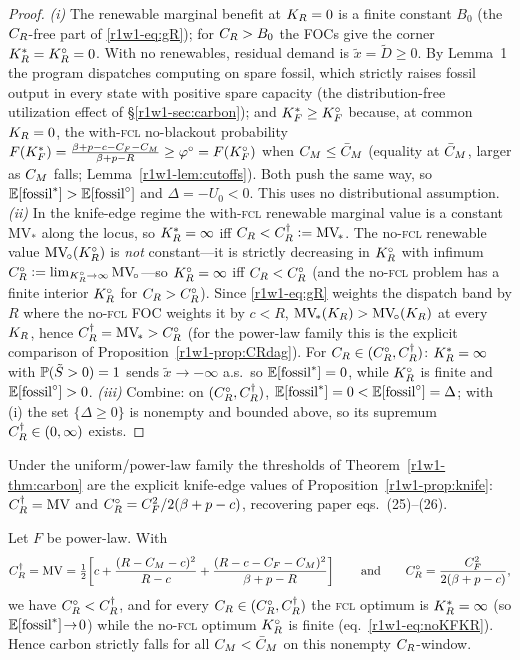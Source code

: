 \begin{proof}
\emph{(i)} The renewable marginal benefit at $K_R=0$ is a finite constant $B_0$
(the $C_R$-free part of \eqref{r1w1-eq:gR}); for $C_R>B_0$ the FOCs give the corner
$K_R^{*}=K_R^{\circ}=0$. With no renewables, residual demand is $\tilde x=\tilde D\ge0$. By
Lemma~1 the program dispatches computing on spare fossil, which strictly raises
fossil output in every state with positive spare capacity (the distribution-free
utilization effect of \S\ref{r1w1-sec:carbon}); and $K_F^{*}\ge K_F^{\circ}$ because, at common
$K_R=0$, the with-\textsc{fcl} no-blackout probability
$F(K_F^{*})=\frac{\beta+p-c-C_F-C_M}{\beta+p-R}\ge\varphi^{\circ}=F(K_F^{\circ})$ when $C_M\le\bar C_M$
(equality at $\bar C_M$, larger as $C_M$ falls; Lemma~\ref{r1w1-lem:cutoffs}). Both push
the same way, so $\mathbb{E}[\text{fossil}^{*}]>\mathbb{E}[\text{fossil}^{\circ}]$ and
$\Delta=-U_0<0$. This uses no distributional assumption.
\emph{(ii)} In the knife-edge regime the with-\textsc{fcl} renewable marginal value is a
constant $\mathrm{MV}_{\!*}$ along the locus, so $K_R^{*}=\infty$ iff
$C_R<C_R^{\dagger}\vcentcolon=\mathrm{MV}_{\!*}$. The no-\textsc{fcl} renewable value
$\mathrm{MV}_{\!\circ}(K_R^{\circ})$ is \emph{not} constant---it is strictly decreasing in $K_R^{\circ}$
with infimum $C_R^{\circ}\vcentcolon=\lim_{K_R^{\circ}\to\infty}\mathrm{MV}_{\!\circ}$---so $K_R^{\circ}=\infty$
iff $C_R<C_R^{\circ}$ (and the no-\textsc{fcl} problem has a finite interior $K_R^{\circ}$ for
$C_R>C_R^{\circ}$). Since \eqref{r1w1-eq:gR} weights the dispatch band by $R$ where the
no-\textsc{fcl} FOC weights it by $c<R$, $\mathrm{MV}_{\!*}(K_R)>\mathrm{MV}_{\!\circ}(K_R)$
at every $K_R$, hence $C_R^{\dagger}=\mathrm{MV}_{\!*}>C_R^{\circ}$ (for the power-law family
this is the explicit comparison of Proposition~\ref{r1w1-prop:CRdag}).
For $C_R\in(C_R^{\circ},C_R^{\dagger})$: $K_R^{*}=\infty$ with $\mathbb{P}(\tilde S>0)=1$ sends
$\tilde x\to-\infty$ a.s.\ so $\mathbb{E}[\text{fossil}^{*}]=0$, while $K_R^{\circ}$ is finite and
$\mathbb{E}[\text{fossil}^{\circ}]>0$.
\emph{(iii)} Combine: on $(C_R^{\circ},C_R^{\dagger})$, $\mathbb{E}[\text{fossil}^{*}]=0<\mathbb{E}[\text{fossil}^{\circ}]=\Delta$;
with (i) the set $\{\Delta\ge0\}$ is nonempty and bounded above, so its supremum
$C_R^{\dagger}\in(0,\infty)$ exists.
\end{proof}

\noindent Under the uniform/power-law family the thresholds of
Theorem~\ref{r1w1-thm:carbon} are the explicit knife-edge values of
Proposition~\ref{r1w1-prop:knife}: $C_R^{\dagger}=\mathrm{MV}$ and
$C_R^{\circ}=C_F^2/2(\beta+p-c)$, recovering paper eqs.\ (25)--(26).

\begin{proposition}\label{r1w1-prop:CRdag}
Let $F$ be power-law. With
\[
  C_R^{\dagger}=\mathrm{MV}
  =\tfrac12\!\left[c+\frac{(R-C_M-c)^2}{R-c}+\frac{(R-c-C_F-C_M)^2}{\beta+p-R}\right]
  \qquad\text{and}\qquad
  C_R^{\circ}=\frac{C_F^{2}}{2(\beta+p-c)},
\]
we have $C_R^{\circ}<C_R^{\dagger}$, and for every $C_R\in(C_R^{\circ},C_R^{\dagger})$
the \textsc{fcl} optimum is $K_R^{*}=\infty$ (so $\mathbb{E}[\text{fossil}^{*}]\!\to\!0$)
while the no-\textsc{fcl} optimum $K_R^{\circ}$ is finite (eq.\ \eqref{r1w1-eq:noKFKR}). Hence
carbon strictly falls for all $C_M<\bar C_M$ on this nonempty $C_R$-window.
\end{proposition}

